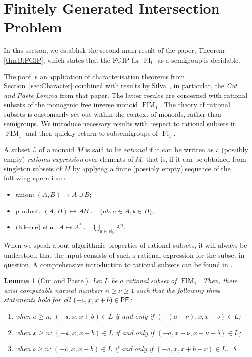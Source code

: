 \documentclass[reqno]{amsart}
\theoremstyle{plain}
\newtheorem{lem}{Lemma}[section]
\theoremstyle{definition}
\DeclareMathOperator{\FI}{FI}
\DeclareMathOperator{\FIM}{FIM}
\DeclareMathOperator{\PE}{\textup{\textsf{PE}}}
\newenvironment{thmenumerate}{\begin{enumerate}[topsep=0mm, leftmargin=14mm,itemsep=1mm,label=\textup{(\roman*)}]
}{\end{enumerate}}
\newenvironment{bulletmidsentence}{\begin{itemize}[topsep=0mm, leftmargin=8mm, itemsep=1mm]
}{\end{itemize}}
\numberwithin{equation}{section}
\begin{document}
\section{Finitely Generated Intersection Problem}
\label{sec:FGIP}


In this section, we establish the second main result of the paper, Theorem \ref{thmB:FGIP}, which states that the FGIP for $\FI_1$ as a semigroup is decidable.


The poof is an application of characterisation theorems from Section~\ref{sec:Character} combined with results by Silva~\cite{SilvaRationalSubset}, in particular, the \emph{Cut and Paste Lemma} from that paper. The latter results are concerned with rational subsets of the monogenic free inverse monoid $\FIM_1$. The theory of rational subsets is customarily set out within the context of monoids, rather than semigroups. We introduce necessary results with respect to rational subsets in $\FIM_1$ and then quickly return to subsemigroups of $\FI_1$. 

A subset $L$ of a monoid $M$ is said to be \emph{rational} 
if it can be written as a (possibly empty) \emph{rational expression} over elements of $M$, that is, 
if it can be obtained from singleton subsets of $M$ by applying a finite (possibly empty) sequence of the following operations:
\begin{bulletmidsentence}
    \item union: $(A,B)\mapsto A\cup B$;
    \item product: $(A,B)\mapsto AB := \{ab: a\in A, b\in B\}$;
    \item (Kleene) star: $A \mapsto A^\ast := \bigcup_{n\in\mathbb{N}_0}A^n$.
\end{bulletmidsentence}
When we speak about algorithmic properties of rational subsets, it will always be understood that the input consists of such a
rational
expression for the subset in question.
A comprehensive introduction to rational subsets can be found in \cite{Berstel}.


\begin{lem}[{Cut and Paste \cite[Lemma 4.2]{SilvaRationalSubset}}]
\label{lem:CutPaste}
Let $L$ be a rational subset of $\FIM_1$. Then, there exist computable natural numbers $n \geq \nu \geq 1$ such that the following three statements hold for all $(-a, x, x+b) \in \PE$:
\begin{thmenumerate}
    \item \label{it:CP1} when $a\geq n$: $(-a, x, x+b)\in L$ if and only if $(-(a-\nu), x, x+b)\in L$;
    \item \label{it:CP2} when $x\geq n$: $(-a, x, x+b)\in L$ if and only if $(-a, x-\nu, x-\nu+b)\in L$;
    \item \label{it:CP3} when $b\geq n$: $(-a, x, x+b)\in L$ if and only if $(-a, x, x+b-\nu)\in L$. \qed
\end{thmenumerate}
\end{lem}
\end{document}
